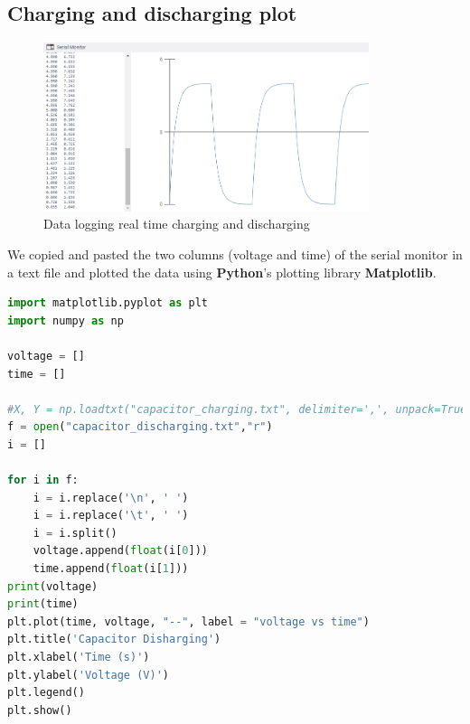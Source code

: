 \subsection{Charging and discharging plot}
        \begin{figure}[!ht]
            \centering
            \includegraphics[width =0.85\textwidth]{images/rc_realtime_plot.png}
            \caption{Data logging real time charging and discharging}
        \end{figure}
We copied and pasted the two columns (voltage and time) of the serial monitor in a text file and plotted the data using \textbf{Python}'s plotting library \textbf{Matplotlib}.

\vspace{10pt} \begin{lstlisting}[language = Python]
import matplotlib.pyplot as plt
import numpy as np

voltage = []
time = []

#X, Y = np.loadtxt("capacitor_charging.txt", delimiter=',', unpack=True)
f = open("capacitor_discharging.txt","r")
i = []

for i in f:
    i = i.replace('\n', ' ')
    i = i.replace('\t', ' ')
    i = i.split()
    voltage.append(float(i[0]))
    time.append(float(i[1]))
print(voltage)
print(time)
plt.plot(time, voltage, "--", label = "voltage vs time")
plt.title('Capacitor Disharging')
plt.xlabel('Time (s)')
plt.ylabel('Voltage (V)')
plt.legend()
plt.show()
\end{lstlisting}

